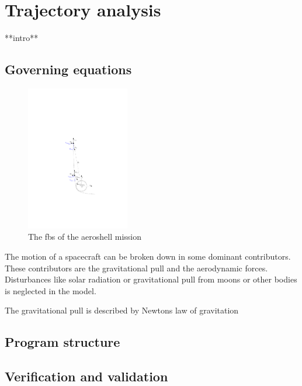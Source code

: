 \section{Trajectory analysis} \label{ch:trajectory}

**intro**

\subsection{Governing equations}

\begin{figure}
		\centering
		\includegraphics[width = 0.4\textwidth]{Figure/orbital_mechanics.pdf}
		\caption{The \gls{fbs} of the aeroshell mission}
		\label{fig:orb}
\end{figure}

The motion of a spacecraft can be broken down in some dominant contributors. These contributors are the gravitational pull and the aerodynamic forces. Disturbances like solar radiation or gravitational pull from moons or other bodies is neglected in the model.

The gravitational pull is described by Newtons law of gravitation



\subsection{Program structure}

\subsection{Verification and validation}